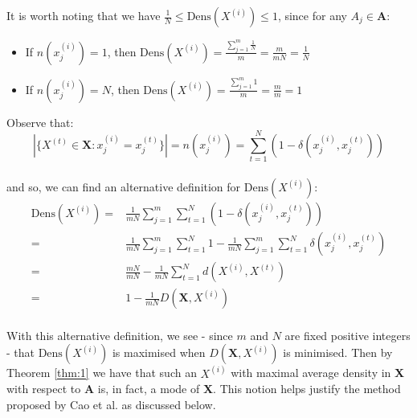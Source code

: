 \begin{remark}
    It is worth noting that we have \(\frac{1}{N} \leq \text{Dens}(X^{(i)})
    \leq 1\), since for any \(A_j \in \textbf{A}\):		
	\begin{itemize}	
        \item If \(n(x_j^{(i)}) = 1\), then \(\text{Dens}(X^{(i)}) = 
			\frac{\sum_{j=1}^m \frac{1}{N}}{m} = \frac{m}{mN} = \frac{1}{N}\)
        \item If \(n(x_j^{(i)}) = N\), then \(\text{Dens}(X^{(i)}) = 
            \frac{\sum_{j=1}^m 1}{m} = \frac{m}{m} = 1\)\\
	\end{itemize}
\end{remark}

\noindent Observe that:
\[
	|\{X^{(t)} \in \textbf{X} : x_j^{(i)} = x_j^{(t)}\}| = n(x_j^{(i)}) = 
	\sum_{t=1}^N (1 - \delta(x_j^{(i)}, x_j^{(t)}))
\]\\

and so, we can find an alternative definition for \(\text{Dens}(X^{(i)})\):
\begin{equation}
\begin{aligned}
    \text{Dens}(X^{(i)}) = {} & {} \frac{1}{mN} \sum_{j=1}^m \sum_{t=1}^N 
                         (1 - \delta(x_j^{(i)}, x_j^{(t)}))
    \\
			             = {} & {} \frac{1}{mN} \sum_{j=1}^m \sum_{t=1}^N 1 - 
                         \frac{1}{mN} \sum_{j=1}^m \sum_{t=1}^N 
                         \delta(x_j^{(i)}, x_j^{(t)})
    \\
                         = {} & {} \frac{mN}{mN} - \frac{1}{mN} \sum_{t=1}^N 
                         d(X^{(i)}, X^{(t)})
    \\
			             = {} & {} 1 - \frac{1}{mN} D(\textbf{X}, X^{(i)})
\end{aligned}
\end{equation}\\

With this alternative definition, we see - since \(m\) and \(N\) are fixed 
positive integers - that \(\text{Dens}(X^{(i)})\) is maximised when 
\(D(\textbf{X}, X^{(i)})\) is minimised. Then by Theorem \ref{thm:1} we have
that such an \(X^{(i)}\) with maximal average density in \textbf{X} with respect
to \textbf{A} is, in fact, a mode of \textbf{X}. This notion helps justify the 
method proposed by Cao et al. as discussed below.\\

